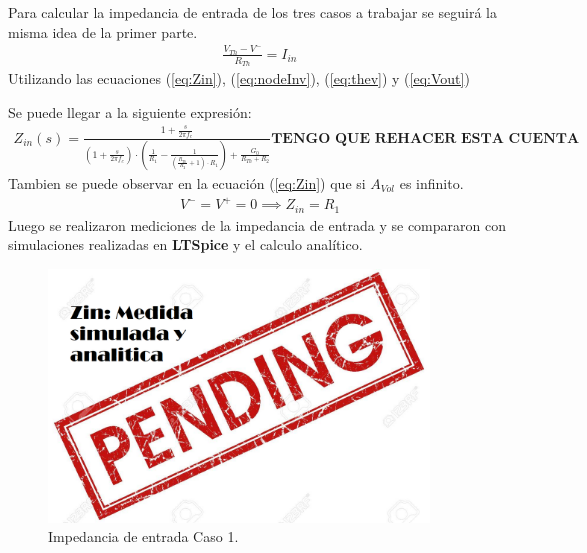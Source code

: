 Para calcular la impedancia de entrada de los tres casos a trabajar se seguirá la misma idea de la primer parte.
\begin{align}
\label{eq:Zin}
\frac{V_{Th} - V^-}{R_{Th}}=I_{in}
\end{align}
Utilizando las ecuaciones (\ref{eq:Zin}), (\ref{eq:nodeInv}), (\ref{eq:thev}) y (\ref{eq:Vout})

Se puede llegar a la siguiente expresión:
\begin{align}
	Z_{in}(s)=\frac{1+\frac{s}{2\pi f_c}}{(1+\frac{s}{2\pi f_c}) \cdot \left( \frac{1}{R_1} - \frac{1}{(\frac{R_{Th}}{R_2}+1 ) \cdot R_1}\right) + \frac{G_0}{R_{Th}+R_2}}
	\textbf{TENGO QUE REHACER ESTA CUENTA}
\end{align}
Tambien se puede observar en la ecuación (\ref{eq:Zin}) que si $A_{Vol}$ es infinito.
\begin{align} V^- = V^+=0 \implies Z_{in}=R_1
\end{align}
Luego se realizaron mediciones de la impedancia de entrada y se compararon con simulaciones realizadas en \textbf{LTSpice} y el calculo analítico.

\begin{figure}[H]	
	\centering
	\includegraphics[width=0.9\textwidth]{Ejercicio1/Imagenes/ZinC1.png}
	\caption{Impedancia de entrada Caso 1.}
	\label{fig:CompZinC1}
\end{figure} 


